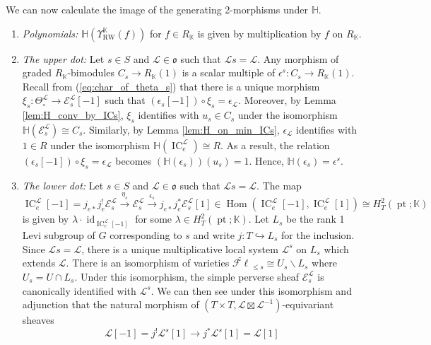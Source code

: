 \documentclass{amsart}
\newcommand{\K}{\mathbb{K}}
\renewcommand{\H}{\mathbb{H}}
\newcommand{\scrE}{\mathcal{E}}
\newcommand{\scrL}{\mathcal{L}}
\DeclareMathOperator{\Hom}{Hom}
\DeclareMathOperator{\IC}{IC}
\DeclareMathOperator{\pt}{pt}
\DeclareMathOperator{\id}{id}
\newcommand{\fr}[1]{\mathfrak{#1}}
\DeclareMathOperator{\RW}{RW}
\newcommand{\eFl}{\widetilde{\mathcal{F}\ell}}
\theoremstyle{definition}
\numberwithin{equation}{subsection}
\begin{document}
We can now calculate the image of the generating 2-morphisms under $\H$.
\begin{enumerate}
    \item \emph{Polynomials:} $\H (\Upsilon_{\RW}^{\K} (f))$ for $f \in R_{\K}$ is given by multiplication by $f$ on $R_{\K}$.
    \item \emph{The upper dot:} Let $s \in S$ and $\scrL \in \fr{o}$ such that $\scrL s = \scrL$. 
            Any morphism of graded $R_{\K}$-bimodules $C_s \to R_{\K} (1)$ is a scalar multiple of $\epsilon^s : C_s \to R_{\K} (1)$.
            Recall from (\ref{eq:char_of_theta_s}) that there is a unique morphism $\xi_s : \Theta_{\circ}^{\scrL} \to \scrE_s^{\scrL} [-1]$ such that $(\epsilon_s [-1]) \circ \xi_s = \epsilon_{\scrL}$. 
            Moreover, by Lemma \ref{lem:H_conv_by_ICs}, $\xi_s$ identifies with $u_s \in C_s $ under the isomorphism $\H (\scrE_s^{\scrL}) \cong C_s$. 
            Similarly, by Lemma \ref{lem:H_on_min_ICs}, $\epsilon_{\scrL}$ identifies with $1 \in R$ under the isomorphism $\H (\IC_e^{\scrL}) \cong R$.
            As a result, the relation $(\epsilon_s [-1]) \circ \xi_s = \epsilon_{\scrL}$ becomes $(\H (\epsilon_s)) (u_s) = 1$. Hence, $\H (\epsilon_s) = \epsilon^s$.
    \item \emph{The lower dot:} 
            Let $s \in S$ and $\scrL \in \fr{o}$ such that $\scrL s = \scrL$. 
            The map
            \[\IC_e^{\scrL} [-1] = j_{e*} j_e^! \scrE_s^{\scrL} \stackrel{\eta_s}{\to} \scrE_s^{\scrL} \stackrel{\epsilon_s}{\to} j_{e*} j_e^* \scrE_s^{\scrL} [1] \in \Hom (\IC_e^{\scrL} [-1] , \IC_e^{\scrL} [1]) \cong H_T^2 (\pt; \K)\]
            is given by $\lambda \cdot \id_{\IC_e^{\scrL} [-1]}$ for some $\lambda \in H_T^2 (\pt; \K)$.  
            Let $L_s$ be the rank 1 Levi subgroup of $G$ corresponding to $s$ and write $j : T \hookrightarrow L_s$ for the inclusion.
            Since $\scrL s = \scrL$, there is a unique multiplicative local system $\scrL^s$ on $L_s$ which extends $\scrL$.
            There is an isomorphism of varieties $\eFl_{\leq s} \cong U_s \backslash L_s$ where $U_s = U \cap L_s$.
            Under this isomorphism, the simple perverse sheaf $\scrE_s^{\scrL}$ is canonically identified with $\scrL^s$. 
            We can then see under this isomorphism and adjunction that the natural morphism of $(T \times T, \scrL \boxtimes \scrL^{-1})$-equivariant sheaves
            \begin{equation}\label{eq:lower_dot_reln_1}
              \scrL [-1] = j^! \scrL^s [1] \to j^* \scrL^s [1] = \scrL [1]
            \end{equation}

\end{enumerate}
\end{document}
